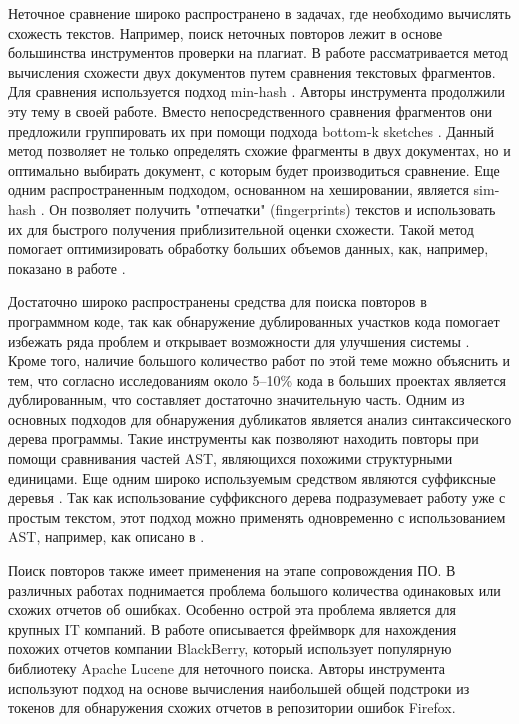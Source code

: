 \documentclass[14pt]{matmex-diploma-custom}
\begin{document}
Неточное сравнение широко распространено в задачах, где необходимо вычислять схожесть текстов. Например, поиск неточных повторов лежит в основе большинства инструментов проверки на плагиат. В работе \cite{bib:tool:Allign} рассматривается метод вычисления схожести двух документов путем сравнения текстовых фрагментов. Для сравнения используется подход min-hash \cite{bib:art:MinHash}. Авторы инструмента \cite{bib:tool:TxtAling} продолжили эту тему в своей работе. Вместо непосредственного сравнения фрагментов они предложили группировать их при помощи подхода bottom-k sketches \cite{bib:art:Bottom-sketch}. Данный метод позволяет не только определять схожие фрагменты в двух документах, но и оптимально выбирать документ, с которым будет производиться сравнение. Еще одним распространенным подходом, основанном на хешировании, является sim-hash \cite{bib:art:SimHash}. Он позволяет получить "отпечатки" (fingerprints) текстов и использовать их для быстрого получения приблизительной оценки схожести. Такой метод помогает оптимизировать обработку больших объемов данных, как, например, показано в работе \cite{bib:tool:SpamDetect}.

Достаточно широко распространены средства для поиска повторов в программном коде, так как обнаружение дублированных участков кода помогает избежать ряда проблем и открывает возможности для улучшения системы \cite{bib:art:SoftwareClonesSurvey, bib:art:SoftwareClonesReview}. Кроме того, наличие большого количество работ по этой теме можно объяснить и тем, что согласно исследованиям \cite{bib:art:LagueCloneStudy, bib:art:BakerCloneStudy} около 5--10\% кода в больших проектах является дублированным, что составляет достаточно значительную часть. Одним из основных подходов для обнаружения дубликатов является анализ синтаксического дерева программы. Такие инструменты как \cite{bib:tool:ASTRefactor, bib:tool:ASTSearch} позволяют находить повторы при помощи сравнивания частей AST, являющихся похожими структурными единицами. Еще одним широко используемым средством являются суффиксные деревья \cite{bib:art:SuffixTree}. Так как использование суффиксного дерева подразумевает работу уже с простым текстом, этот подход можно применять одновременно с использованием AST, например, как описано в \cite{bib:tool:ASTSuffix}.

Поиск повторов также имеет применения на этапе сопровождения ПО. В различных работах поднимается проблема большого количества одинаковых или схожих отчетов об ошибках. Особенно острой эта проблема является для крупных IT компаний. В работе \cite{bib:tool:DefectDetection} описывается фреймворк для нахождения похожих отчетов компании BlackBerry, который использует популярную библиотеку Apache Lucene \cite{bib:tool:Lucene} для неточного поиска. Авторы инструмента \cite{bib:tool:DuplicateBugs} используют подход на основе вычисления наибольшей общей подстроки из токенов \cite{bib:art:LCS} для обнаружения схожих отчетов в репозитории ошибок Firefox.
\end{document}
